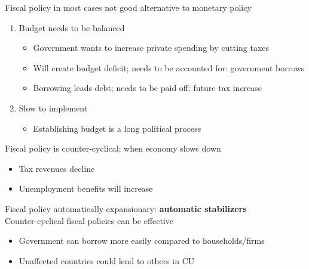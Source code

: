 \documentclass{beamer}
\begin{document}
\begin{frame}
  Fiscal policy in most cases not good alternative to monetary policy
\begin{enumerate}
  \item Budget needs to be balanced
  \begin{itemize}
    \item Government wants to increase private spending by cutting taxes
    \item Will create budget deficit; needs to be accounted for: government borrows
    \item Borrowing leads debt; needs to be paid off: future tax increase
  \end{itemize}
  \medskip
  \item Slow to implement
  \begin{itemize}
    \item Establishing budget is a long political process
  \end{itemize}
\end{enumerate}
\end{frame}

\begin{frame}
   Fiscal policy is counter-cyclical; when economy slows down
  \begin{itemize}
    \item Tax revenues decline
    \item Unemployment benefits will increase
  \end{itemize}  
  \medskip
  Fiscal policy automatically expansionary: \textbf{automatic stabilizers}  \\
  \bigskip
  Counter-cyclical fiscal policies can be effective
  \begin{itemize}
    \item Government can borrow more easily compared to households/firms
    \item Unaffected countries could lend to others in CU
  \end{itemize}
\end{frame}
\end{document}
